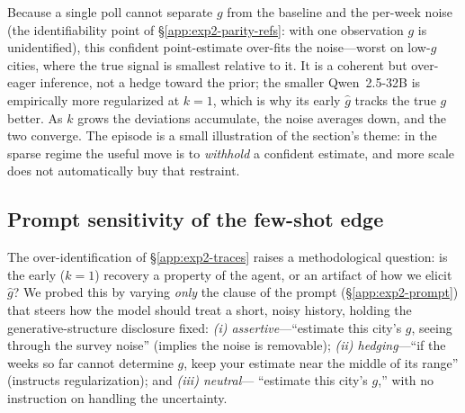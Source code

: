 Because a single poll cannot separate $g$ from the baseline and the per-week noise (the
identifiability point of \S\ref{app:exp2-parity-refs}: with one observation $g$ is unidentified),
this confident point-estimate over-fits the noise---worst on low-$g$ cities, where the true signal is
smallest relative to it. It is a coherent but over-eager inference, not a hedge toward the prior; the
smaller Qwen~2.5-32B is empirically more regularized at $k{=}1$, which is why its early $\hat g$
tracks the true $g$ better. As $k$ grows the deviations accumulate, the noise averages down, and the
two converge. The episode is a small illustration of the section's theme: in the sparse regime the
useful move is to \emph{withhold} a confident estimate, and more scale does not automatically buy
that restraint.

\subsection{Prompt sensitivity of the few-shot edge}
\label{app:exp2-promptsens}

The over-identification of \S\ref{app:exp2-traces} raises a methodological question: is the early
($k{=}1$) recovery a property of the agent, or an artifact of how we elicit $\hat g$? We probed this
by varying \emph{only} the clause of the prompt (\S\ref{app:exp2-prompt}) that steers how the model
should treat a short, noisy history, holding the generative-structure disclosure fixed:
\emph{(i) assertive}---``estimate this city's $g$, seeing through the survey noise'' (implies the
noise is removable); \emph{(ii) hedging}---``if the weeks so far cannot determine $g$, keep your
estimate near the middle of its range'' (instructs regularization); and \emph{(iii) neutral}---
``estimate this city's $g$,'' with no instruction on handling the uncertainty.

